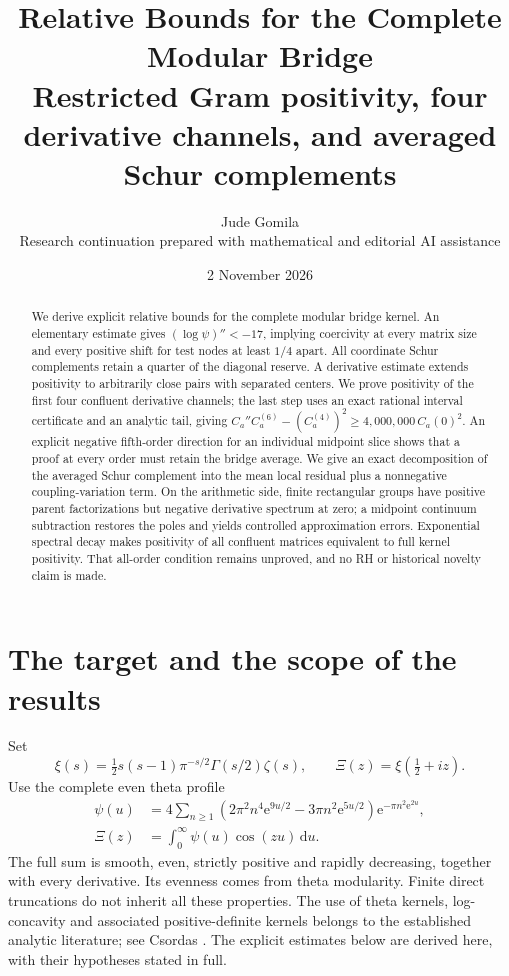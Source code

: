 \documentclass[11pt,letterpaper]{article}
\title{\textbf{Relative Bounds for the Complete Modular Bridge}\\[0.45em]
\large Restricted Gram positivity, four derivative channels, and averaged Schur complements}
\author{Jude Gomila\\\small Research continuation prepared with mathematical and editorial AI assistance}
\date{2 November 2026}
\numberwithin{equation}{section}
\theoremstyle{remark}\newtheorem{remark}[theorem]{Remark}
\newcommand{\dd}{\,\mathrm d}
\newcommand{\ee}{\mathrm e}
\begin{document}
\maketitle
\begin{abstract}
We derive explicit relative bounds for the complete modular bridge kernel. An elementary estimate gives $(\log\psi)''<-17$, implying coercivity at every matrix size and every positive shift for test nodes at least $1/4$ apart. All coordinate Schur complements retain a quarter of the diagonal reserve. A derivative estimate extends positivity to arbitrarily close pairs with separated centers. We prove positivity of the first four confluent derivative channels; the last step uses an exact rational interval certificate and an analytic tail, giving $C_a''C_a^{(6)}-(C_a^{(4)})^2\ge4{,}000{,}000\,C_a(0)^2$. An explicit negative fifth-order direction for an individual midpoint slice shows that a proof at every order must retain the bridge average. We give an exact decomposition of the averaged Schur complement into the mean local residual plus a nonnegative coupling-variation term. On the arithmetic side, finite rectangular groups have positive parent factorizations but negative derivative spectrum at zero; a midpoint continuum subtraction restores the poles and yields controlled approximation errors. Exponential spectral decay makes positivity of all confluent matrices equivalent to full kernel positivity. That all-order condition remains unproved, and no RH or historical novelty claim is made.
\end{abstract}

\section{The target and the scope of the results}
Set
\begin{equation}
\xi(s)=\tfrac12s(s-1)\pi^{-s/2}\Gamma(s/2)\zeta(s),
\qquad \Xi(z)=\xi(\tfrac12+iz).
\end{equation}
Use the complete even theta profile
\begin{align}
\psi(u)&=4\sum_{n\ge1}
\left(2\pi^2n^4\ee^{9u/2}-3\pi n^2\ee^{5u/2}\right)
\ee^{-\pi n^2\ee^{2u}},\label{eq:psi}\\
\Xi(z)&=\int_0^\infty\psi(u)\cos(zu)\dd u.
\end{align}
The full sum is smooth, even, strictly positive and rapidly decreasing, together with every derivative. Its evenness comes from theta modularity. Finite direct truncations do not inherit all these properties. The use of theta kernels, log-concavity and associated positive-definite kernels belongs to the established analytic literature; see Csordas \cite{csordas}. The explicit estimates below are derived here, with their hypotheses stated in full.
\end{document}

